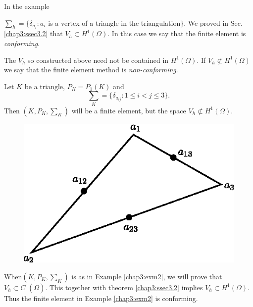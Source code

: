 \begin{REM}\label{chap3:REM4}
In the example

$\sum_h=\{ \delta_{a_i}:a_i$ is a vertex of a triangle in the
triangulation$\}$.
We proved in Sec. \ref{chap3:ssec3.2} that $V_h\subset
H^1(\Omega)$. In this case we say that the finite element is \emph{conforming}.
\end{REM}

\begin{REM}\label{chap3:REM5}
The $V_h$ so constructed above need not be contained in
$H^1(\Omega)$. If $V_h\nsubset H^1(\Omega)$ we say that the finite
element method is \emph{non-conforming}.

Let $K$ be a triangle, $P_K=P_1(K)$ and
$$
\sum_K=\{ \delta_{a_{ij}}:1\leq i<j\leq 3\}.
$$
Then $(K, P_K, \sum_K)$ will be a finite element, but the space
$V_h\nsubset H^1(\Omega)$.
\begin{figure}[H]
\centering
\includegraphics{figure/fig3.6.eps}
\caption{}\label{fig3.6}
\end{figure}
\end{REM}

When\pageoriginale $(K, P_K, \sum_K)$ is as in Example
\ref{chap3:exm2}, we will prove that $V_h\subset
C^\circ(\overline{\Omega})$. This together with theorem
\ref{chap3:ssec3.2} implies $V_h\subset H^1(\Omega)$. Thus the finite
element in Example \ref{chap3:exm2} is conforming. 

